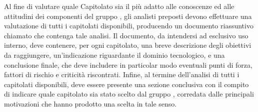 Al fine di valutare quale Capitolato sia il pi\`{u} adatto alle conoscenze ed alle attitudini dei componenti del gruppo \Gruppo{}, gli analisti preposti devono effettuare una valutazione di tutti i capitolati disponibili, producendo un documento riassuntivo chiamato \SdFv{} che contenga tale analisi. Il documento, da intendersi ad esclusivo uso interno, deve contenere, per ogni capitolato, una breve descrizione degli obiettivi da raggiungere, un'indicazione riguardante il dominio tecnologico, e una conclusione finale, che deve includere in particolar modo eventuali punti di forza, fattori di rischio e criticit\`{a} riscontrati. Infine, al termine dell'analisi di tutti i capitolati disponibili, deve essere presente una sezione conclusiva con il compito di indicare quale capitolato sia stato scelto dal gruppo \Gruppo{}, corredata dalle principali motivazioni che hanno prodotto una scelta in tale senso.